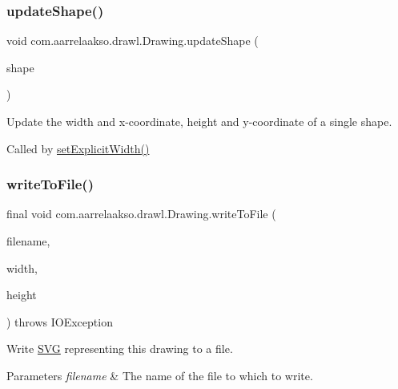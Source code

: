 \subsubsection{\texorpdfstring{update\+Shape()}{updateShape()}}
{\footnotesize\ttfamily void com.\+aarrelaakso.\+drawl.\+Drawing.\+update\+Shape (\begin{DoxyParamCaption}\item[{@Not\+Null final \hyperlink{classcom_1_1aarrelaakso_1_1drawl_1_1_shape}{Shape}}]{shape }\end{DoxyParamCaption})\hspace{0.3cm}{\ttfamily [private]}}



Update the width and x-\/coordinate, height and y-\/coordinate of a single shape. 

Called by \hyperlink{classcom_1_1aarrelaakso_1_1drawl_1_1_drawing_a547eda8e04300947a0e424f62589e5c4}{set\+Explicit\+Width()} \mbox{\label{classcom_1_1aarrelaakso_1_1drawl_1_1_drawing_a3cf3359170b92a63cdcb5ab67a18562e}} 
\subsubsection{\texorpdfstring{write\+To\+File()}{writeToFile()}}
{\footnotesize\ttfamily final void com.\+aarrelaakso.\+drawl.\+Drawing.\+write\+To\+File (\begin{DoxyParamCaption}\item[{@Not\+Null final String}]{filename,  }\item[{@Not\+Null final Integer}]{width,  }\item[{@Not\+Null final Integer}]{height }\end{DoxyParamCaption}) throws I\+O\+Exception}



Write \hyperlink{classcom_1_1aarrelaakso_1_1drawl_1_1_s_v_g}{S\+VG} representing this drawing to a file. 


\begin{DoxyParams}{Parameters}
{\em filename} & The name of the file to which to write. \\
\hline
\end{DoxyParams}

